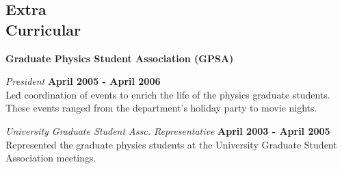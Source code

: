 \documentclass[letterpaper,margin,line]{res}
\begin{document}
\begin{resume}
\section{\sc Extra\\ Curricular}
{\bf Graduate Physics Student Association (GPSA)}

\vspace{-.3cm}
{\em President} \hfill {\bf April 2005 - April 2006} \\
Led coordination of events to enrich the life of the physics graduate students. These events ranged from the department's holiday party to movie nights.

\vspace{-.3cm}
{\em University Graduate Student Assc. Representative} \hfill {\bf April 2003 - April 2005}\\
Represented the graduate physics students at the University Graduate Student Association meetings.






% 



\end{resume}
\end{document}
